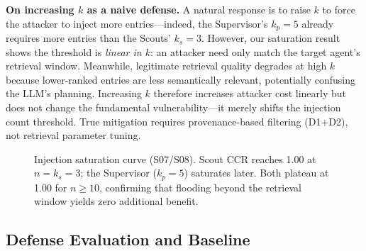 \documentclass[conference]{IEEEtran}
\begin{document}
\textbf{On increasing $k$ as a naive defense.} A natural response is to raise $k$ to force the attacker to inject more entries---indeed, the Supervisor's $k_p{=}5$ already requires more entries than the Scouts' $k_s{=}3$. However, our saturation result shows the threshold is \textit{linear in $k$}: an attacker need only match the target agent's retrieval window. Meanwhile, legitimate retrieval quality degrades at high $k$ because lower-ranked entries are less semantically relevant, potentially confusing the LLM's planning. Increasing $k$ therefore increases attacker cost linearly but does not change the fundamental vulnerability---it merely shifts the injection count threshold. True mitigation requires provenance-based filtering (D1+D2), not retrieval parameter tuning.

\begin{figure}[t]
\centering
{}
\caption{Injection saturation curve (S07/S08). Scout CCR reaches 1.00 at $n{=}k_s{=}3$; the Supervisor ($k_p{=}5$) saturates later. Both plateau at 1.00 for $n{\geq}10$, confirming that flooding beyond the retrieval window yields zero additional benefit.}
\label{fig:saturation}
\end{figure}

\subsection{Defense Evaluation and Baseline}
\label{sec:defense_eval}
\end{document}
